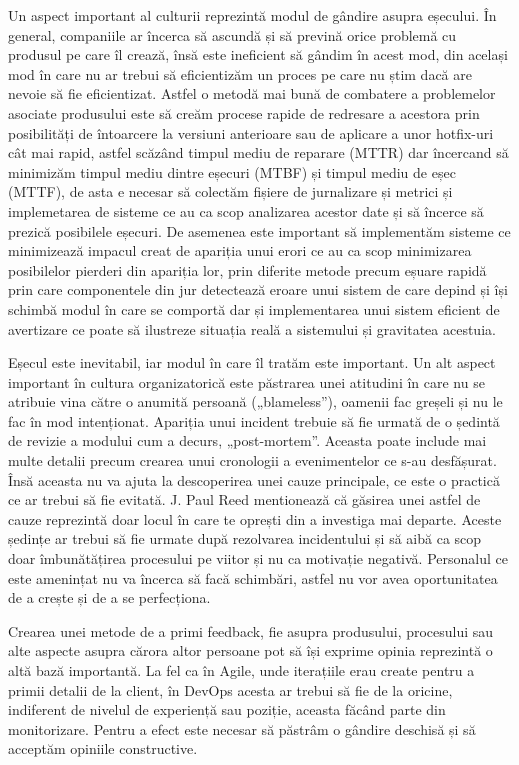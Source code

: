 Un aspect important al culturii reprezintă modul de gândire asupra eșecului.
În general, companiile ar încerca să ascundă și să prevină orice problemă cu
produsul pe care îl crează, însă este ineficient să gândim în acest mod, din același
mod în care nu ar trebui să eficientizăm un proces pe care nu știm dacă are nevoie să
fie eficientizat. Astfel o metodă mai bună de combatere a problemelor asociate
produsului este să creăm procese rapide de redresare a acestora prin posibilități
de întoarcere la versiuni anterioare sau de aplicare a unor hotfix-uri cât mai rapid, astfel scăzând
timpul mediu de reparare (MTTR) dar încercand să minimizăm timpul mediu dintre eșecuri (MTBF)
și timpul mediu de eșec (MTTF), de asta e necesar să colectăm fișiere de jurnalizare
și metrici și implemetarea de sisteme ce au ca scop analizarea acestor date
și să încerce să prezică posibilele eșecuri. De asemenea este important să
implementăm sisteme ce minimizează impacul creat de apariția unui erori ce au ca scop
minimizarea posibilelor pierderi din apariția lor, prin diferite
metode precum eșuare rapidă prin care componentele din jur detectează eroare unui sistem
de care depind și își schimbă modul în care se comportă dar și implementarea
unui sistem eficient de avertizare ce poate să ilustreze situația reală a sistemului
și gravitatea acestuia.

Eșecul este inevitabil, iar modul în care îl tratăm este important. Un alt aspect important
în cultura organizatorică este păstrarea unei atitudini în care nu se atribuie vina către
o anumită persoană („blameless”), oamenii fac greșeli și nu le fac în mod intenționat.
Apariția unui incident trebuie să fie urmată de o ședintă de revizie a modului
cum a decurs, „post-mortem”. Aceasta poate include mai multe detalii precum crearea unui cronologii
a evenimentelor ce s-au desfășurat. Însă aceasta nu va ajuta la descoperirea unei cauze
principale, ce este o practică ce ar trebui să fie evitată. J. Paul Reed mentionează
că găsirea unei astfel de cauze reprezintă doar locul în care te oprești din a investiga mai departe.
Aceste ședințe ar trebui să fie urmate după rezolvarea incidentului și să aibă ca scop
doar îmbunătățirea procesului pe viitor și nu ca motivație negativă. Personalul
ce este amenințat nu va încerca să facă schimbări, astfel nu vor avea oportunitatea de a
crește și de a se perfecționa.

Crearea unei metode de a primi feedback, fie asupra produsului, procesului sau
alte aspecte asupra cărora altor persoane pot să își exprime opinia reprezintă
o altă bază importantă. La fel ca în Agile, unde iterațiile erau create
pentru a primii detalii de la client, în DevOps acesta ar trebui să fie de la oricine,
indiferent de nivelul de experiență sau poziție, aceasta făcând parte din
monitorizare. Pentru a efect este necesar să păstrâm o gândire deschisă și să
acceptăm opiniile constructive.

